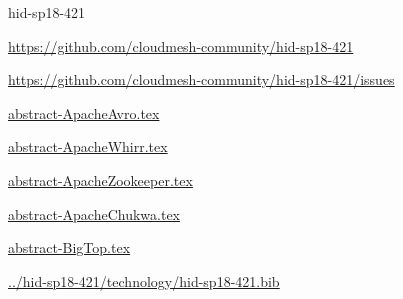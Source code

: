 \begin{IU}

hid-sp18-421

\url{https://github.com/cloudmesh-community/hid-sp18-421}

\url{https://github.com/cloudmesh-community/hid-sp18-421/issues}

\href{https://github.com/cloudmesh-community/hid-sp18-421/blob/master//technology/abstract-ApacheAvro.tex}{abstract-ApacheAvro.tex}

\href{https://github.com/cloudmesh-community/hid-sp18-421/blob/master//technology/abstract-ApacheWhirr.tex}{abstract-ApacheWhirr.tex}

\href{https://github.com/cloudmesh-community/hid-sp18-421/blob/master//technology/abstract-ApacheZookeeper.tex}{abstract-ApacheZookeeper.tex}

\href{https://github.com/cloudmesh-community/hid-sp18-421/blob/master//technology/abstract-ApacheChukwa.tex}{abstract-ApacheChukwa.tex}

\href{https://github.com/cloudmesh-community/hid-sp18-421/blob/master//technology/abstract-BigTop.tex}{abstract-BigTop.tex}

\href{https://github.com/cloudmesh-community/hid-sp18-421/blob/master//technology/hid-sp18-421.bib}{../hid-sp18-421/technology/hid-sp18-421.bib}

\end{IU}


